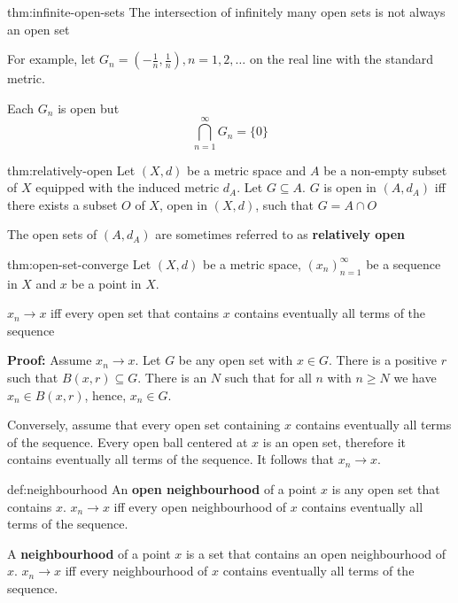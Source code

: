 \documentclass[landscape, 8pt]{extarticle}
\begin{document}
\begin{multicols}{3}
\begin{thm}{thm:infinite-open-sets}{}
    The intersection of infinitely many open sets is not always an open set
    
    For example, let $G_{n} = (- \frac{1}{n}, \frac{1}{n}), n = 1,2,\dots$ on the real line with the standard metric.

    Each $G_{n}$ is open but
    \[\bigcap\limits_{n = 1}^{\infty} G_{n} = \{0\}\]
\end{thm}

\newpage

\begin{thm}{thm:relatively-open}{}
    Let $(X,d)$ be a metric space and $A$ be a non-empty subset of $X$ equipped with the induced metric $d_{A}$. Let $G\subseteq A$. $G$ is open in $(A, d_{A})$ iff there exists a subset $O$ of $X$, open in $(X,d)$, such that $G = A \cap O$

    The open sets of $(A, d_{A})$ are sometimes referred to as \textbf{relatively open}
\end{thm}

\begin{thm}[]{thm:open-set-converge}{}
    Let $(X, d)$ be a metric space, $(x_{n})^{\infty}_{n=1}$ be a sequence in $X$ and $x$ be a point in $X$.

    $x_{n}\to x$ iff every open set that contains $x$ contains eventually all terms of the sequence
\end{thm}

\textbf{Proof:} Assume $x_{n}\to x$. Let $G$ be any open set with $x\in G$. There is a positive $r$ such that $B(x,r) \subseteq G$. There is an $N$ such that for all $n$ with $n \ge N$ we have $x_{n}\in B(x,r)$, hence, $x_{n}\in G$.

Conversely, assume that every open set containing $x$ contains eventually all terms of the sequence. Every open ball centered at $x$ is an open set, therefore it contains eventually all terms of the sequence. It follows that $x_{n}\to x$.


\begin{dfn}{def:neighbourhood}{}
    An \textbf{open neighbourhood} of a point $x$ is any open set that contains $x$. $x_{n}\to x$ iff every open neighbourhood of $x$ contains eventually all terms of the sequence.

    \longrule{0.08ex}

    A \textbf{neighbourhood} of a point $x$ is a set that contains an open neighbourhood of $x$.  $x_{n}\to x$ iff every neighbourhood of $x$ contains eventually all terms of the sequence.
\end{dfn}


\end{multicols}
\end{document}
